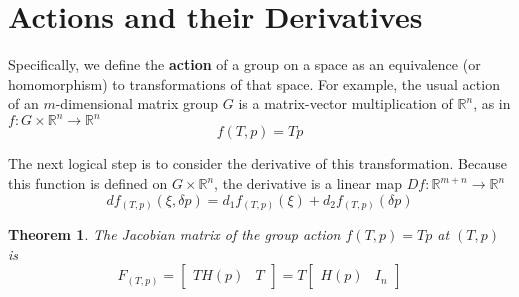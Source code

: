 \documentclass[reqno]{amsart}
\newtheorem{thm}{Theorem}[section]
\theoremstyle{definition}
\numberwithin{equation}{section}
\begin{document}
\section{Actions and their Derivatives}

Specifically, we define the \textbf{action} of a group on a space as an equivalence (or homomorphism) to transformations of that space. For example, the usual action of an $m$-dimensional matrix group $G$ is a matrix-vector multiplication of $\mathbb{R}^n$, as in $f : G \times \mathbb{R}^n \to \mathbb{R}^n$
\begin{equation*}
    f(T, p) = Tp
\end{equation*}

The next logical step is to consider the derivative of this transformation. Because this function is defined on $G \times \mathbb{R}^n$, the derivative is a linear map $Df: \mathbb{R}^{m + n} \to \mathbb{R}^n$
\begin{equation*}
    df_{(T, p)}(\xi, \delta{p}) = d_1f_{(T, p)}(\xi) + d_2f_{(T, p)}(\delta{p})
\end{equation*}

\begin{thm}
    The Jacobian matrix of the group action $f(T, p) = Tp$ at $(T, p)$ is
    \begin{equation*}
        F_{(T, p)} = \begin{bmatrix} TH(p) & T\end{bmatrix} = T\begin{bmatrix} H(p) & I_n \end{bmatrix}
    \end{equation*}
\end{thm}
\end{document}

